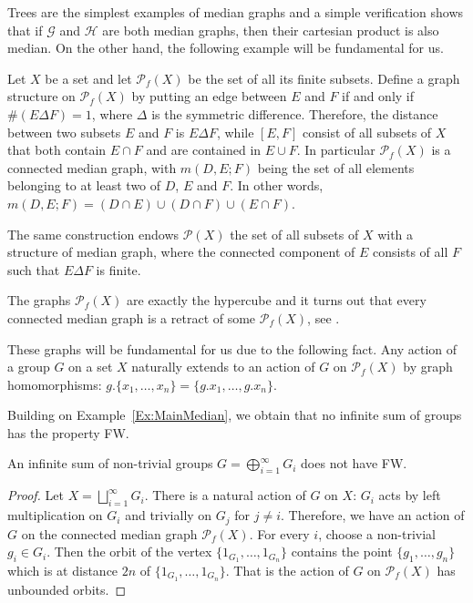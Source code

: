 Trees are the simplest examples of median graphs and a simple verification shows that if $\mathcal G$ and $\mathcal H$ are both median graphs, then their cartesian product is also median.
On the other hand, the following example will be fundamental for us.
\begin{exmp}\label{Ex:MainMedian}
Let $X$ be a set and let  $\mathcal P_f(X)$ be the set of all its finite subsets.
Define a graph structure on $\mathcal P_f(X)$ by putting an edge between $E$ and $F$ if and only if $\#(E\Delta F)=1$, where $\Delta$ is the symmetric difference.
Therefore, the distance between two subsets $E$ and $F$ is $E\Delta F$, while $[E,F]$ consist of all subsets of $X$ that both contain $E\cap F$ and are contained in $E\cup F$.
In particular $\mathcal P_f(X)$ is a connected median graph, with $m(D,E;F)$ being the set of all elements belonging to at least two of $D$, $E$ and $F$. In other words,
$m(D,E;F)=(D\cap E)\cup(D\cap F)\cup(E\cap F)$.

The same construction endows $\mathcal P(X)$ the set of all subsets of $X$ with a structure of median graph, where the connected component of $E$ consists of all $F$ such that $E\Delta F$ is finite.
\end{exmp}

The graphs $\mathcal P_f(X)$ are exactly the hypercube and it turns out that every connected median graph is a retract of some $\mathcal P_f(X)$, see \cite{Bandelt1984}.

These graphs will be fundamental for us due to the following fact.
Any action of a group $G$ on a set $X$ naturally extends to an action of $G$ on $\mathcal P_f(X)$ by graph homomorphisms: $g.\{x_1,\dots,x_n\}=\{g.x_1,\dots,g.x_n\}$.

Building on Example~\ref{Ex:MainMedian}, we obtain that no infinite sum of groups has the property FW.
\begin{lem}\label{Lemma:Sum}
An infinite sum of non-trivial groups $G=\bigoplus_{i=1}^\infty G_i$ does not have FW.
\end{lem}
\begin{proof}
Let $X=\bigsqcup_{i=1}^\infty G_i$.
There is a natural action of $G$ on $X$: $G_i$ acts by left multiplication on $G_i$ and trivially on $G_j$ for $j\neq i$.
Therefore, we have an action of $G$ on the connected median graph $\mathcal P_f(X)$.
For every $i$, choose a non-trivial $g_i\in G_i$.
Then the orbit of the vertex $\{1_{G_1},\dots, 1_{G_n}\}$ contains the point $\{g_1,\dots, g_n\}$ which is at distance $2n$ of $\{1_{G_1},\dots, 1_{G_n}\}$.
That is the action of $G$ on $\mathcal P_f(X)$ has unbounded orbits.
\end{proof}

